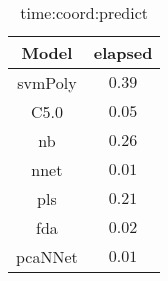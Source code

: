 \begin{table}[!ht]
	\centering
	\begin{tabular}{|c|c|}
		\hline
		Model & elapsed \\ \hline
		svmPoly & $0.39$ \\ \hline
		C5.0 & $0.05$ \\ \hline
		nb & $0.26$ \\ \hline
		nnet & $0.01$ \\ \hline
		pls & $0.21$ \\ \hline
		fda & $0.02$ \\ \hline
		pcaNNet & $0.01$ \\ \hline
	\end{tabular}
	\caption{time:coord:predict}
	\label{tab:time:coord:predict}
\end{table}
